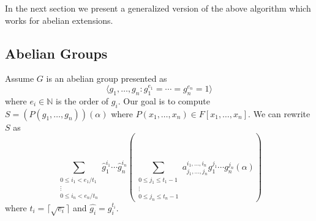 
In the next section
we present a generalized version of the above algorithm which works for abelian extensions.

\subsection{Abelian Groups}
Assume $G$ is an abelian group presented as 
$$ \langle g_1, \ldots , g_n: g_{1}^{e_1} = \cdots = g_{n}^{e_n} = 1 \rangle$$
 where $ e_i \in \mathbb{N}$
is the order of $g_i$. Our goal is to compute $S = (P(g_1,  \ldots, g_n))(\alpha)$ where $P(x_1, \ldots,x_n) \in F[x_1, \dots , x_n].$
We can rewrite $S$ as 
$$\sum_{\substack{0 \leq i_1 < e_1/t_1 \\ \vdots \\ 0 \leq i_n < e_n/t_n}} \hat{g}_1^{i_1} \cdots \hat{g}_n^{i_n}(\sum_{\substack{0 \leq j_1 \leq t_1-1\\ \vdots \\ 0 \leq j_n \leq t_n-1}} a^{i_1, \ldots , i_n}_{j_1, \ldots , j_n}g_1^{j_1}\cdots g_n^{j_n}(\alpha))$$
where $t_i = \lceil \sqrt{e_i}\rceil$ and $\hat{g_i} = g_i^{t_i}.$

